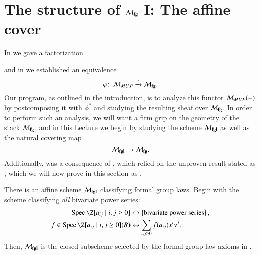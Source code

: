 \section{The structure of \texorpdfstring{$\mathcal{M}_{\mathbf{fg}}$}{Mfg} I: The affine cover}\label{MfgI:AffineCover}

In  we gave a factorization
\begin{center}
\end{center}
and in  we established an equivalence \[\varphi\colon\thinspace \mathcal{M}_{MUP} \xrightarrow{\simeq} \mathcal{M}_{\mathbf{fg}}.\]  Our program, as outlined in the introduction, is to analyze this functor $\mathcal{M}_{MUP}(-)$ by postcomposing it with $\phi^*$ and studying the resulting sheaf over $\mathcal{M}_{\mathbf{fg}}$.  In order to perform such an analysis, we will want a firm grip on the geometry of the stack $\mathcal{M}_{\mathbf{fg}}$, and in this Lecture we begin by studying the scheme $\mathcal{M}_{\mathbf{fgl}}$ as well as the natural covering map \[\mathcal{M}_{\mathbf{fgl}} \to \mathcal{M}_{\mathbf{fg}}.\]  Additionally,  was a consequence of , which relied on the unproven result stated as , which we will now prove in this section as .

\begin{definition}\label{MfglDefn}
There is an affine scheme $\mathcal{M}_{\mathbf{fgl}}$ classifying formal group laws.  Begin with the scheme classifying \emph{all} bivariate power series:
\begin{align*}
\Spec \Z[a_{ij} \mid i, j \ge 0] & \leftrightarrow \left\{ \text{bivariate power series} \right\}, \\
f \in \Spec\Z[a_{ij} \mid i, j \ge 0](R) & \leftrightarrow \sum_{i, j \ge 0} f(a_{ij}) x^i y^j.
\end{align*}
Then, $\mathcal{M}_{\mathbf{fgl}}$ is the closed subscheme selected by the formal group law axioms in .
\end{definition}

